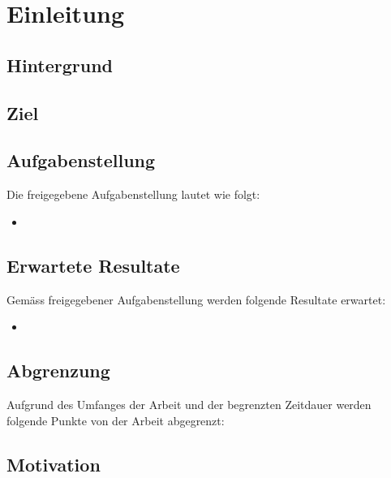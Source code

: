 
\chapter{Einleitung}

\section{Hintergrund}


\section{Ziel}


\section{Aufgabenstellung} \label{sec:Aufgabenstellung}
Die freigegebene Aufgabenstellung lautet wie folgt:

\begin{itemize}
\item 
\end{itemize}


\section{Erwartete Resultate} \label{sec:ErwarteteResultate}
Gemäss freigegebener Aufgabenstellung werden folgende Resultate erwartet:

\begin{itemize}
\item 
\end{itemize}


\section{Abgrenzung} \label{sec:Abgrenzung}
Aufgrund des Umfanges der Arbeit und der begrenzten Zeitdauer werden folgende Punkte von der Arbeit abgegrenzt:

\begin{itemize}

\end{itemize}


\section{Motivation}

